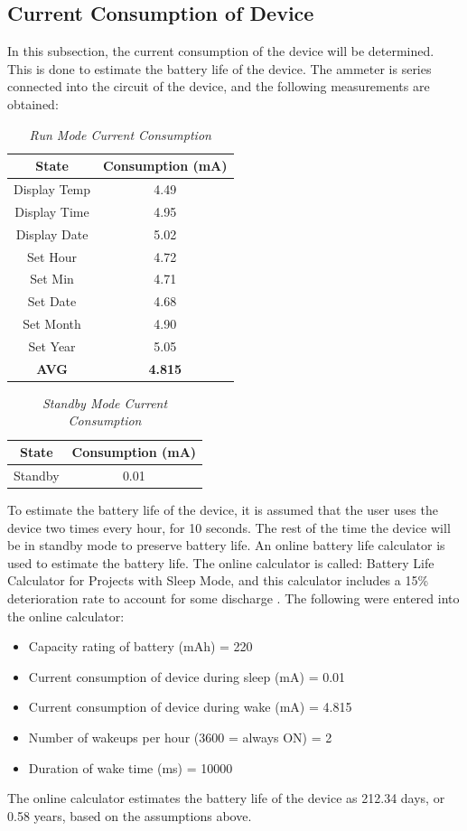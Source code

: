 \subsection{Current Consumption of Device}
In this subsection, the current consumption of the device will be determined. This is done to estimate the battery life of the device. The ammeter is series connected into the circuit of the device, and the following measurements are obtained:
\begin{table}[H]
	\centering
	\caption{\textit{Run Mode Current Consumption}}
	\label{tab:8}
	\begin{tabular}{|c|c|}
		\hline
		\textbf{State} &  \textbf{Consumption (mA)} \\
		\hline
		\hline
		Display Temp & 4.49 \\
		\hline
		Display Time & 4.95 \\
		\hline
		Display Date & 5.02\\
		\hline
		Set Hour & 4.72\\
		\hline
		Set Min & 4.71\\
		\hline
		Set Date & 4.68 \\
		\hline
		Set Month & 4.90 \\
		\hline
		Set Year & 5.05 \\
		\hline
		\textbf{AVG} & \textbf{4.815}\\
		\hline
	\end{tabular}
\end{table}
\begin{table}[H]
	\centering
	\caption{\textit{Standby Mode Current Consumption}}
	\label{tab:9}
	\begin{tabular}{|c|c|}
		\hline
		\textbf{State} &  \textbf{Consumption (mA)} \\
		\hline
		\hline
		Standby & 0.01\\
		\hline
	\end{tabular}
\end{table}
\noindent
To estimate the battery life of the device, it is assumed that the user uses the device two times every hour, for 10 seconds. The rest of the time the device will be in standby mode to preserve battery life. An online battery life calculator is used to estimate the battery life. The online calculator is called: Battery Life Calculator for Projects with Sleep Mode, and this calculator includes a 15\% deterioration rate to account for some discharge \cite{Calc2021}. The following were entered into the online calculator:
\begin{itemize}[noitemsep]
    \item Capacity rating of battery (mAh) = 220
    \item Current consumption of device during sleep (mA) = 0.01
    \item Current consumption of device during wake (mA) = 4.815
    \item Number of wakeups per hour (3600 = always ON) = 2
    \item Duration of wake time (ms) = 10000
\end{itemize}
\noindent
The online calculator estimates the battery life of the device as 212.34 days, or 0.58 years, based on the assumptions above. 

